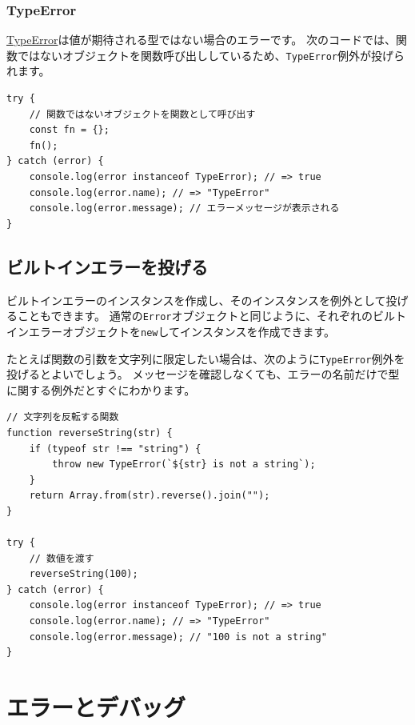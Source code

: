 \hypertarget{type-error}{%
\subsubsection{TypeError}\label{type-error}}

\href{https://developer.mozilla.org/ja/docs/Web/JavaScript/Reference/Global_Objects/TypeError}{TypeError}は値が期待される型ではない場合のエラーです。
次のコードでは、関数ではないオブジェクトを関数呼び出ししているため、\texttt{TypeError}例外が投げられます。

\begin{lstlisting}
try {
    // 関数ではないオブジェクトを関数として呼び出す
    const fn = {};
    fn();
} catch (error) {
    console.log(error instanceof TypeError); // => true
    console.log(error.name); // => "TypeError"
    console.log(error.message); // エラーメッセージが表示される
}
\end{lstlisting}

\hypertarget{throw-built-in-error}{%
\subsection{ビルトインエラーを投げる}\label{throw-built-in-error}}

ビルトインエラーのインスタンスを作成し、そのインスタンスを例外として投げることもできます。
通常の\texttt{Error}オブジェクトと同じように、それぞれのビルトインエラーオブジェクトを\texttt{new}してインスタンスを作成できます。

たとえば関数の引数を文字列に限定したい場合は、次のように\texttt{TypeError}例外を投げるとよいでしょう。
メッセージを確認しなくても、エラーの名前だけで型に関する例外だとすぐにわかります。

\begin{lstlisting}
// 文字列を反転する関数
function reverseString(str) {
    if (typeof str !== "string") {
        throw new TypeError(`${str} is not a string`);
    }
    return Array.from(str).reverse().join("");
}

try {
    // 数値を渡す
    reverseString(100);
} catch (error) {
    console.log(error instanceof TypeError); // => true
    console.log(error.name); // => "TypeError"
    console.log(error.message); // "100 is not a string"
}
\end{lstlisting}

\hypertarget{error-and-debug}{%
\section{エラーとデバッグ}\label{error-and-debug}}

